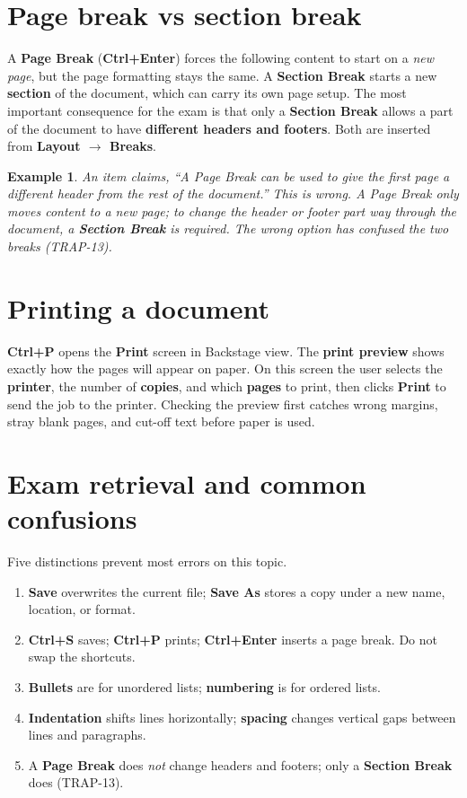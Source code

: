 \documentclass[11pt]{article}
\newtheorem{example}{Example}[section]
\begin{document}
\section{Page break vs section break}
A \textbf{Page Break} (\textbf{Ctrl+Enter}) forces the following content to
start on a \emph{new page}, but the page formatting stays the same. A
\textbf{Section Break} starts a new \textbf{section} of the document, which
can carry its own page setup. The most important consequence for the exam is
that only a \textbf{Section Break} allows a part of the document to have
\textbf{different headers and footers}. Both are inserted from
\textbf{Layout $\rightarrow$ Breaks}.

\begin{example}
An item claims, ``A Page Break can be used to give the first page a
different header from the rest of the document.'' This is wrong. A Page
Break only moves content to a new page; to change the header or footer part
way through the document, a \textbf{Section Break} is required. The wrong
option has confused the two breaks (TRAP-13).
\end{example}

\section{Printing a document}
\textbf{Ctrl+P} opens the \textbf{Print} screen in Backstage view. The
\textbf{print preview} shows exactly how the pages will appear on paper. On
this screen the user selects the \textbf{printer}, the number of
\textbf{copies}, and which \textbf{pages} to print, then clicks \textbf{Print}
to send the job to the printer. Checking the preview first catches wrong
margins, stray blank pages, and cut-off text before paper is used.

\section{Exam retrieval and common confusions}
Five distinctions prevent most errors on this topic.
\begin{enumerate}
  \item \textbf{Save} overwrites the current file; \textbf{Save As} stores a
    copy under a new name, location, or format.
  \item \textbf{Ctrl+S} saves; \textbf{Ctrl+P} prints; \textbf{Ctrl+Enter}
    inserts a page break. Do not swap the shortcuts.
  \item \textbf{Bullets} are for unordered lists; \textbf{numbering} is for
    ordered lists.
  \item \textbf{Indentation} shifts lines horizontally; \textbf{spacing}
    changes vertical gaps between lines and paragraphs.
  \item A \textbf{Page Break} does \emph{not} change headers and footers;
    only a \textbf{Section Break} does (TRAP-13).
\end{enumerate}
\end{document}
